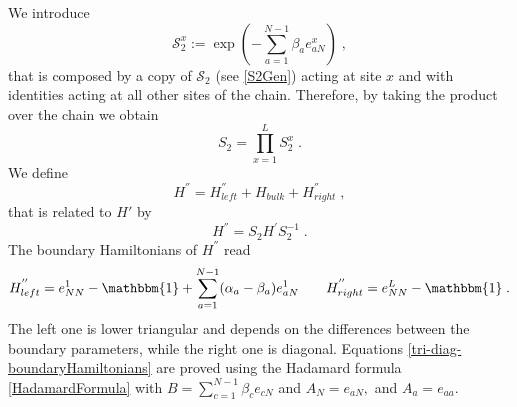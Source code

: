 \documentclass[10pt]{article}
\numberwithin{equation}{section}
\numberwithin{equation}{subsection}
\newcommand{\co}{\;,}
\newcommand{\dt}{\;.}
\begin{document}
We introduce
 \begin{equation}
 	\mathcal{S}_{2}^{x}:=\exp{\left(-\sum_{a=1}^{N-1}\beta_{a}e_{aN}^{x}\right)}\co%
 \end{equation}
that is composed by a copy of $\mathcal{S}_{2}$ (see \eqref{S2Gen}) acting at site $x$ and with identities acting at all other sites of the chain. 
Therefore, by taking the product over the chain we obtain 
\begin{equation}\label{S2-Whole}
	S_{2}=\prod_{x=1}^{L}S_{2}^{x}\dt
\end{equation}
We define 
\begin{equation}\label{HSecond}
	H^{''}=H_{left}^{''}+H_{bulk}+H_{right}^{''}\co
\end{equation}
that is related to $H'$ by
\begin{equation}
	H^{''}=S_{2}H^{'}S_{2}^{-1}\dt
\end{equation}
The boundary Hamiltonians of $H^{''}$ read
\begin{align}\label{tri-diag-boundaryHamiltonians}
	H_{left}^{''}=e_{NN}^{1}-\mathbbm{1}+\sum_{a=1}^{N-1}(\alpha_{a}-\beta_{a})e_{aN}^{1}\qquad H_{right}^{''}=e_{NN}^{L}-\mathbbm{1}\dt
\end{align}
The left one is lower triangular and depends on the differences between the boundary parameters, while the right one is diagonal. Equations \eqref{tri-diag-boundaryHamiltonians} are proved using the Hadamard formula \eqref{HadamardFormula} with $B=\sum_{c=1}^{N-1}\beta_{c}e_{cN}$ and $A_{N}=e_{aN},$ and $A_{a}=e_{aa}$.
\begin{comment}
 We compute
\begin{enumerate}
	\item $A_{N}=e_{aN}$ with $a\neq 1$
	\begin{equation}
		\exp{\left(-\sum_{c=1}^{N-1}\beta_{c}e_{cN}\right)}e_{aN}\exp{\left(\sum_{c=1}^{N-1}\beta_{c}e_{cN}\right)}=e_{aN}
	\end{equation}
\item $A_{a}=e_{aa}$ with $a\neq 1$
\begin{equation}
		\exp{\left(-\sum_{c=1}^{N-1}\beta_{c}e_{cN}\right)}e_{aa}\exp{\left(\sum_{c=1}^{N}\beta_{c}e_{cN}\right)}=e_{aa}+\beta_{a}e_{aN}
	\end{equation}
Indeed 
\begin{equation}
	\sum_{c=1}^{N-1}[e_{cN},e_{aa}]=\sum_{c=1}^{N-1}\beta_{c}\left(e_{ca}\delta_{aN}-e_{aN}\delta_{ca}\right)=-\beta_{a}e_{aN}
\end{equation}
\end{enumerate}
\end{comment}
\end{document}

